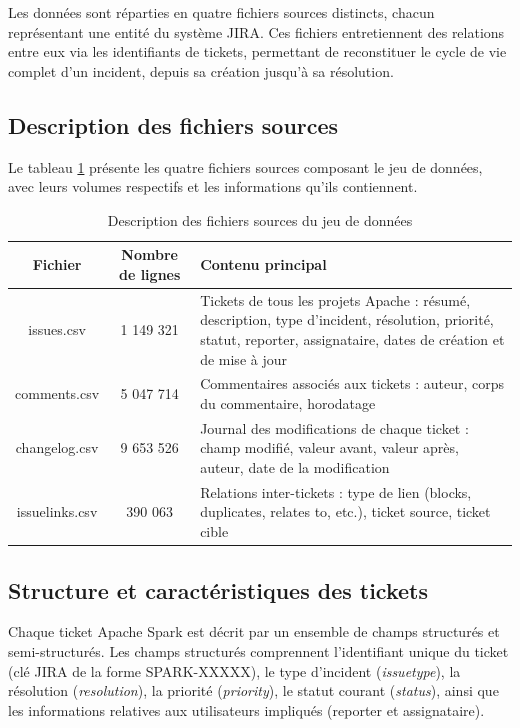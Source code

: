 Les données sont réparties en quatre fichiers sources distincts, chacun représentant une entité du système JIRA. Ces fichiers entretiennent des relations entre eux via les identifiants de tickets, permettant de reconstituer le cycle de vie complet d'un incident, depuis sa création jusqu'à sa résolution.

\subsection{Description des fichiers sources}

Le tableau \ref{tab:dataset} présente les quatre fichiers sources composant le jeu de données, avec leurs volumes respectifs et les informations qu'ils contiennent.

\begin{table}[h!]
\centering
\begin{tabularx}{\textwidth}{|c|c|X|}
  \hline
  \textbf{Fichier} & \textbf{Nombre de lignes} & \textbf{Contenu principal} \\
  \hline
  issues.csv & 1 149 321 & Tickets de tous les projets Apache : résumé, description, type d'incident, résolution, priorité, statut, reporter, assignataire, dates de création et de mise à jour \\
  \hline
  comments.csv & 5 047 714 & Commentaires associés aux tickets : auteur, corps du commentaire, horodatage \\
  \hline
  changelog.csv & 9 653 526 & Journal des modifications de chaque ticket : champ modifié, valeur avant, valeur après, auteur, date de la modification \\
  \hline
  issuelinks.csv & 390 063 & Relations inter-tickets : type de lien (blocks, duplicates, relates to, etc.), ticket source, ticket cible \\
  \hline
\end{tabularx}
\caption{Description des fichiers sources du jeu de données}
\label{tab:dataset}
\end{table}

\subsection{Structure et caractéristiques des tickets}

Chaque ticket Apache Spark est décrit par un ensemble de champs structurés et semi-structurés. Les champs structurés comprennent l'identifiant unique du ticket (clé JIRA de la forme SPARK-XXXXX), le type d'incident (\textit{issuetype}), la résolution (\textit{resolution}), la priorité (\textit{priority}), le statut courant (\textit{status}), ainsi que les informations relatives aux utilisateurs impliqués (reporter et assignataire).


